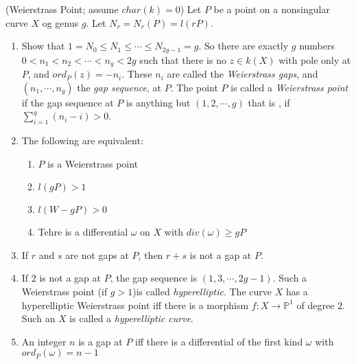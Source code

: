 \documentclass{solution}
\begin{document}
\begin{problem}{8.37}
    (Weierstrass Point; assume $char(k) = 0$) Let $P$ be a point on a nonsingular curve $X$ og genus $g$. Let $N_r = N_r(P) = l(rP)$.
    \begin{enumerate}
        \item Show that $1 = N_0 \le N_1 \le \cdots \le N_{2g - 1} = g$. So there are exactly $g$ numbers $0 \lt n_1 \lt n_2 \lt \cdots \lt n_g \lt 2g$ such that there is no $z \in k(X)$ with pole only at $P$, and $ord_P(z) = -n_i$. These $n_i$ are called the \textit{Weierstrass gaps}, and $(n_1, \cdots, n_g)$ the \textit{gap sequence}, at $P$. The point $P$ is called a \textit{Weierstrass point} if the gap sequence at $P$ is anything but $(1, 2, \cdots, g)$ that is , if $\sum\limits_{i = 1}^{g} (n_i - i) \gt 0$.
        \item The following are equivalent:
        \begin{enumerate}
            \item $P$ is a Weierstrass point
            \item $l(gP) \gt 1$
            \item $l(W - gP) \gt 0$
            \item Tehre is a differential $\omega$ on $X$ with $div(\omega) \ge gP$
        \end{enumerate}
        \item  If $r$ and $s$ are not gaps at $P$, then $r + s$ is not a gap at $P$.
        \item If $2$ is not a gap at $P$, the gap sequence is $(1, 3, \cdots, 2g - 1)$. Such a Weierstrass point (if $g \gt 1$)is called \textit{hyperelliptic}. The curve $X$ has a hyperelliptic Weierstrass point iff there is a morphism $f: X \rightarrow \mathbb{P}^1$ of degree $2$. Such an $X$ is called a \textit{hyperelliptic curve}.
        \item An integer $n$ is a gap at $P$ iff there is a differential of the first kind $\omega$ with $ord_P(\omega) = n - 1$
    \end{enumerate}
\end{problem}
\end{document}
